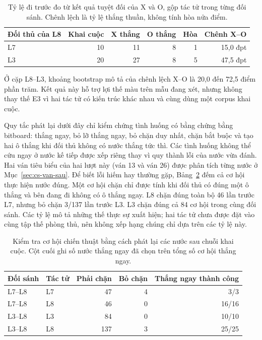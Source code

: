 \begin{table}[H]
\centering\small
\begin{tabular}{@{}lrrrrr@{}}
\toprule
Đối thủ của L8 & Khai cuộc & X thắng & O thắng & Hòa & Chênh X--O \\
\midrule
L7 & 10 & 11 & 8 & 1 & 15,0 đpt \\
L3 & 20 & 27 & 8 & 5 & 47,5 đpt \\
\bottomrule
\end{tabular}
\caption{Tỷ lệ đi trước đo từ kết quả tuyệt đối của X và O, gộp tác tử trong từng đối sánh. Chênh lệch là tỷ lệ thắng thuần, không tính hòa nửa điểm.}
\label{tab:mau-gop}
\end{table}
Ở cặp L8--L3, khoảng bootstrap mô tả của chênh lệch X--O là 20,0 đến 72,5
điểm phần trăm. Kết quả này hỗ trợ lợi thế màu trên mẫu đang xét, nhưng không
thay thế E3 vì hai tác tử có kiến trúc khác nhau và cùng dùng một corpus khai cuộc.

Quy tắc phát lại dưới đây chỉ kiểm chứng tình huống có bằng chứng bằng bitboard: thắng ngay, bỏ lỡ thắng ngay, bỏ chặn duy nhất, chặn bắt buộc và tạo hai ô thắng khi đối thủ không có nước thắng tức thì. Các tình huống không thể cứu ngay ở nước kế tiếp được xếp riêng thay vì quy thành lỗi của nước vừa đánh. Hai ván tiêu biểu của hai lượt này (ván 13 và ván 26) được phân tích từng nước ở Mục~\ref{sec:cs-van-sau}.
Để biết lỗi hiếm hay thường gặp, Bảng~\ref{tab:co-hoi-chien-thuat} đếm cả cơ hội thực hiện
nước đúng. Một cơ hội chặn chỉ được tính khi đối thủ có đúng một ô thắng và
bên đang đi không có ô thắng ngay. L8 chặn đúng toàn bộ 46 lần trước L7, nhưng
bỏ chặn 3/137 lần trước L3. L3 chặn đúng cả 84 cơ hội trong cùng đối sánh.
Các tỷ lệ mô tả những thế thực sự xuất hiện; hai tác tử chưa được đặt vào
cùng tập thế phòng thủ, nên không xếp hạng chúng chỉ dựa trên các tỷ lệ này.

\begin{table}[H]
\centering\small
\begin{tabular}{@{}llrrr@{}}
\toprule
Đối sánh & Tác tử & Phải chặn & Bỏ chặn & Thắng ngay thành công \\
\midrule
L7--L8 & L7 & 47 & 4 & 3/3 \\
L7--L8 & L8 & 46 & 0 & 16/16 \\
L3--L8 & L3 & 84 & 0 & 10/10 \\
L3--L8 & L8 & 137 & 3 & 25/25 \\
\bottomrule
\end{tabular}
\caption{Kiểm tra cơ hội chiến thuật bằng cách phát lại các nước sau chuỗi khai cuộc. Cột cuối ghi số nước thắng ngay đã chọn trên tổng số cơ hội thắng ngay.}
\label{tab:co-hoi-chien-thuat}
\end{table}

